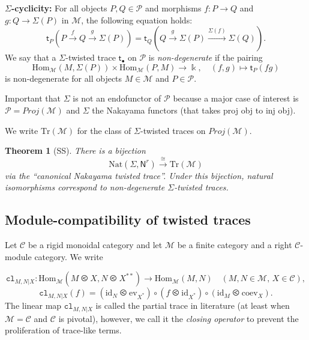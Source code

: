 \documentclass[11pt]{article}
\newtheorem{theorem}{Theorem}[section]
\theoremstyle{definition}
\begin{document}
\medskip
\noindent\textbf{$\Sigma$-cyclicity:} For all objects $P, Q \in \mathcal{P}$ and morphisms $f : P \to Q$ and $g : Q \to
\Sigma(P)$ in $\mathcal{M}$, the following equation holds:
\begin{equation}
\mathsf{t}_P\!\left(P \xrightarrow{f} Q \xrightarrow{g} \Sigma(P)\right)
= \mathsf{t}_Q\!\left(Q \xrightarrow{g} \Sigma(P) \xrightarrow{\Sigma(f)} \Sigma(Q)\right). \tag{3.1}
\end{equation}
We say that a $\Sigma$-twisted trace $\mathsf{t}_\bullet$ on $\mathcal{P}$ is \emph{non-degenerate} if the pairing
\[
\mathrm{Hom}_{\mathcal{M}}(M, \Sigma(P)) \times \mathrm{Hom}_{\mathcal{M}}(P, M) \to \Bbbk, \quad (f, g) \mapsto \mathsf{t}_P(fg)
\]
is non-degenerate for all objects $M \in \mathcal{M}$ and $P \in \mathcal{P}$.


Important that $\Sigma$ is not an endofunctor of $\mathcal{P}$ because a major case of interest is $\mathcal{P} = Proj (\mathcal{M})$ and $\Sigma$ the Nakayama functors (that takes proj obj to inj obj).


We write $\mathrm{Tr}(\mathcal{M})$ for the class of $\Sigma$-twisted traces on $Proj(\mathcal{M})$.


\begin{theorem}[SS]
There is a bijection
$$ \mathrm{Nat}(\Sigma, \mathsf{N}^r) \overset{\cong}{\to}  \mathrm{Tr}(\mathcal{M}) $$ via the ``canonical Nakayama twisted trace''. Under this bijection, natural isomorphisms correspond to non-degenerate $\Sigma$-twisted traces.
\end{theorem}



\subsection{Module-compatibility of twisted traces}

Let $\mathcal{C}$ be a rigid monoidal category and let $\mathcal{M}$ be a finite category and a  right $\mathcal{C}$-module category. We write

\[
\mathtt{cl}_{M,N|X} : \mathrm{Hom}_{\mathcal{M}}(M \olessthan X, N \olessthan X^{**}) \to \mathrm{Hom}_{\mathcal{M}}(M, N)
\quad (M, N \in \mathcal{M},\, X \in \mathcal{C}),
\]
\[
\mathtt{cl}_{M,N|X}(f) = (\mathrm{id}_N \olessthan \mathrm{ev}_{X^*}) \circ (f \olessthan \mathrm{id}_{X^*}) \circ (\mathrm{id}_M \olessthan \mathrm{coev}_X).
\]
The linear map $\mathtt{cl}_{M,N|X}$ is called the partial trace in literature (at least when
$\mathcal{M} = \mathcal{C}$ and $\mathcal{C}$ is pivotal), however, we call it the \emph{closing operator} to prevent the proliferation of trace-like terms.
\end{document}

